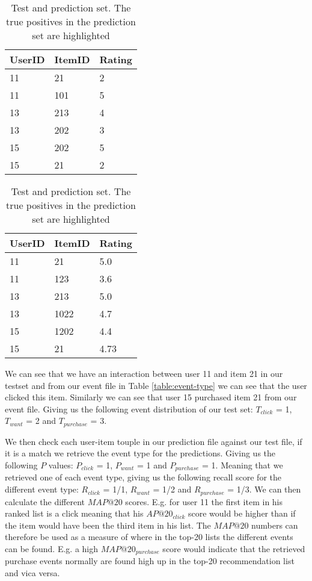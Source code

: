 \begin{table}[H]
\parbox{.45\linewidth}{
	\centering
		\begin{tabular}{*{3}l}
		\toprule
			UserID	&	ItemID	 &  Rating  	\\ \midrule
			11		&	21		 &	2			\\
			11		&	101		 &	5			\\
			13		&	213		 &	4			\\
			13		&	202		 &  3			\\
			15		&	202		 &  5			\\
			15		&	21		 &  2			\\
		\bottomrule
		\end{tabular}
}
\hfill
\parbox{.45\linewidth}{
	\centering
		\begin{tabular}{*{3}l}
		\toprule
			UserID	&	ItemID	 &  Rating  	\\ \midrule
			\rowcolor{Gray}
			11		&	21		 &	5.0			\\
			11		&	123		 &	3.6			\\
			\rowcolor{Gray}
			13		&	213		 &	5.0			\\
			13		&	1022	 &  4.7			\\
			15		&	1202	 &  4.4			\\
			\rowcolor{Gray}
			15		&	21		 &  4.73		\\
		\bottomrule
	\end{tabular}	
}
\caption[Test and prediction set example]{Test and prediction set. The true positives in the prediction set are highlighted}
\end{table}


We can see that we have an interaction between user 11 and item 21 in our testset and from our event file in
Table \ref{table:event-type} we can see that the user clicked this item. Similarly we can see that user 15 purchased
item 21 from our event file. Giving us the following event distribution of our test set: $T_{click}$ = 1, $T_{want}$ = 2 and
$T_{purchase}$ = 3. 

We then check each user-item touple in our prediction file against our test file, if it is a match we retrieve the
event type for the predictions. Giving us the following $P$ values: $P_{click}$ = 1, $P_{want}$ = 1 and $P_{purchase}$ = 1.
Meaning that we retrieved one of each event type, giving us the following recall score for the different event type:
$R_{click}$ = 1/1, $R_{want}$ = 1/2 and $R_{purchase}$ = 1/3. We can then calculate the different $MAP@20$ scores. E.g. for user 11
the first item in his ranked list is a click meaning that his $AP@20_{click}$ score would be higher than if the item
would have been the third item in his list. The $MAP@20$ numbers can therefore be used as a measure of where in the
top-20 lists the different events can be found. E.g. a high $MAP@20_{purchase}$ score would indicate that the retrieved
purchase events normally are found high up in the top-20 recommendation list and vica versa.
 

